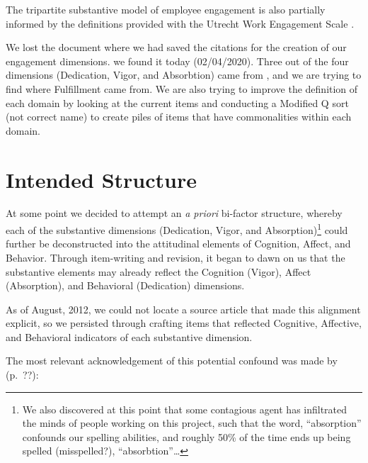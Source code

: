 \documentclass[
]{book}
\begin{document}
The tripartite substantive model of employee engagement is also partially informed by the definitions provided with the Utrecht Work Engagement Scale \citep{schaufeli_utrecht_2003}.

We lost the document where we had saved the citations for the creation of our engagement dimensions. we found it today (02/04/2020).
Three out of the four dimensions (Dedication, Vigor, and Absorbtion) came from \citet{schaufeli_measurement_2002}, and we are trying to find where Fulfillment came from.
We are also trying to improve the definition of each domain by looking at the current items and conducting a Modified Q sort (not correct name) to create piles of items that have commonalities within each domain.

\hypertarget{ABCDAV}{%
\section{Intended Structure}\label{ABCDAV}}

At some point we decided to attempt an \emph{a priori} bi-factor structure, whereby each of the substantive dimensions (Dedication, Vigor, and Absorption)\footnote{We also discovered at this point that some contagious agent has infiltrated the minds of people working on this project, such that the word, ``absorption'' confounds our spelling abilities, and roughly 50\% of the time ends up being spelled (misspelled?), ``absorbtion''\ldots{}} could further be deconstructed into the attitudinal elements of Cognition, Affect, and Behavior. Through item-writing and revision, it began to dawn on us that the substantive elements may already reflect the Cognition (Vigor), Affect (Absorption), and Behavioral (Dedication) dimensions.

As of August, 2012, we could not locate a source article that made this alignment explicit, so we persisted through crafting items that reflected Cognitive, Affective, and Behavioral indicators of each substantive dimension.

The most relevant acknowledgement of this potential confound was made by \citet{schaufeli_measurement_2002} (p.~??):
\end{document}
